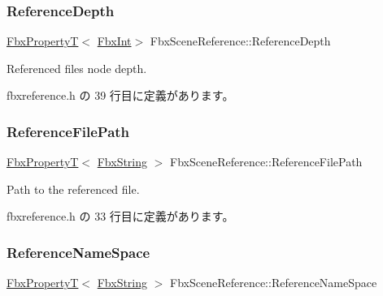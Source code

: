 \subsubsection{\texorpdfstring{Reference\+Depth}{ReferenceDepth}}
{\footnotesize\ttfamily \hyperlink{class_fbx_property_t}{Fbx\+PropertyT}$<$ \hyperlink{fbxtypes_8h_a088fa96de3b0b3ea69f0f6afef525dfb}{Fbx\+Int}$>$ Fbx\+Scene\+Reference\+::\+Reference\+Depth}



Referenced file\textquotesingle{}s node depth. 



 fbxreference.\+h の 39 行目に定義があります。

\mbox{\label{class_fbx_scene_reference_a782b9db13deb9ab4b1f5b1b48c4dbb0a}} 
\subsubsection{\texorpdfstring{Reference\+File\+Path}{ReferenceFilePath}}
{\footnotesize\ttfamily \hyperlink{class_fbx_property_t}{Fbx\+PropertyT}$<$ \hyperlink{class_fbx_string}{Fbx\+String} $>$ Fbx\+Scene\+Reference\+::\+Reference\+File\+Path}



Path to the referenced file. 



 fbxreference.\+h の 33 行目に定義があります。

\mbox{\label{class_fbx_scene_reference_aa29e70b4a27c20a537c4daa567624821}} 
\subsubsection{\texorpdfstring{Reference\+Name\+Space}{ReferenceNameSpace}}
{\footnotesize\ttfamily \hyperlink{class_fbx_property_t}{Fbx\+PropertyT}$<$ \hyperlink{class_fbx_string}{Fbx\+String} $>$ Fbx\+Scene\+Reference\+::\+Reference\+Name\+Space}



